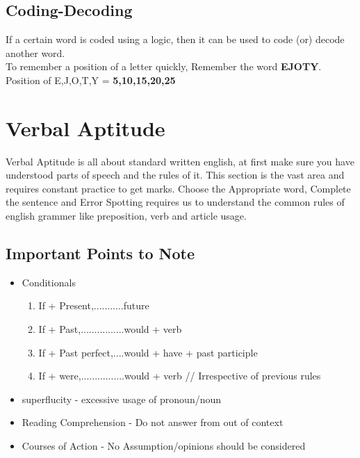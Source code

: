 \subsection{Coding-Decoding}
If a certain word is coded using a logic, then it can be used to code (or) decode another word.\\
To remember a position of a letter quickly, Remember the word \textbf{EJOTY}.\\
Position of E,J,O,T,Y = \textbf{5,10,15,20,25}


\section{Verbal Aptitude}
Verbal Aptitude is all about standard written english, at first make sure you have understood parts of speech and the rules of it. This section is the vast area and requires constant practice to get marks. Choose the Appropriate word, Complete the sentence and Error Spotting requires us to understand the common rules of english grammer like preposition, verb and article usage.


\subsection{Important Points to Note}
\begin{itemize}
    \item Conditionals
        \begin{enumerate}
            \item If + Present,...........future
            \item If + Past,................would + verb
            \item If + Past perfect,....would + have + past participle
            \item If + were,................would + verb // Irrespective of previous rules
        \end{enumerate}
    \item superflucity - excessive usage of pronoun/noun
    \item Reading Comprehension - Do not answer from out of context
    \item Courses of Action - No Assumption/opinions should be considered
\end{itemize}